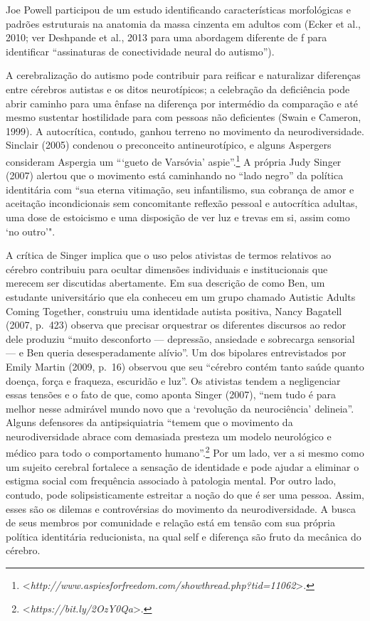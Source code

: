 Joe Powell participou de um estudo identificando características
morfológicas e padrões estruturais na anatomia da massa cinzenta em
adultos com  (Ecker et al., 2010; ver Deshpande et al., 2013 para uma
abordagem diferente de f para identificar ``assinaturas de
conectividade neural do autismo'').

A cerebralização do autismo pode contribuir para reificar e naturalizar
diferenças entre cérebros autistas e os ditos neurotípicos; a celebração
da deficiência pode abrir caminho para uma ênfase na diferença por
intermédio da comparação e até mesmo sustentar hostilidade para com
pessoas não deficientes (Swain e Cameron, 1999). A autocrítica, contudo,
ganhou terreno no movimento da neurodiversidade. Sinclair (2005)
condenou o preconceito antineurotípico, e alguns Aspergers consideram
Aspergia um ```gueto de Varsóvia' aspie''.\footnote[31]{\textless{}\emph{http://www.aspiesforfreedom.com/showthread.php?tid=11062}\textgreater{}.} A própria
Judy Singer (2007) alertou que o movimento está caminhando no ``lado
negro'' da política identitária com ``sua eterna vitimação, seu
infantilismo, sua cobrança de amor e aceitação incondicionais sem
concomitante reflexão pessoal e autocrítica adultas, uma dose de
estoicismo e uma disposição de ver luz e trevas em si, assim como `no
outro'".

A crítica de Singer implica que o uso pelos ativistas de termos
relativos ao cérebro contribuiu para ocultar dimensões individuais e
institucionais que merecem ser discutidas abertamente. Em sua descrição
de como Ben, um estudante universitário que ela conheceu em um grupo
chamado Autistic Adults Coming Together, construiu uma identidade
autista positiva, Nancy Bagatell (2007, p.~423) observa que precisar
orquestrar os diferentes discursos ao redor dele produziu ``muito
desconforto --- depressão, ansiedade e sobrecarga sensorial --- e Ben
queria desesperadamente alívio''. Um dos bipolares entrevistados por
Emily Martin (2009, p.~16) observou que seu ``cérebro contém tanto saúde
quanto doença, força e fraqueza, escuridão e luz''. Os ativistas tendem
a negligenciar essas tensões e o fato de que, como aponta Singer (2007),
``nem tudo é para melhor nesse admirável mundo novo que a `revolução da
neurociência' delineia''. Alguns defensores da antipsiquiatria ``temem
que o movimento da neurodiversidade abrace com demasiada presteza um
modelo neurológico e médico para todo o comportamento
humano''.\footnote[32]{\textless{}\emph{https://bit.ly/2OzY0Qa}\textgreater{}.} Por um lado, ver a si mesmo como um
sujeito cerebral fortalece a sensação de identidade e pode ajudar a
eliminar o estigma social com frequência associado à patologia mental.
Por outro lado, contudo, pode solipsisticamente estreitar a noção do que
é ser uma pessoa. Assim, esses são os dilemas e controvérsias do
movimento da neurodiversidade. A busca de seus membros por comunidade e
relação está em tensão com sua própria política identitária
reducionista, na qual self e diferença são fruto da mecânica do cérebro.

